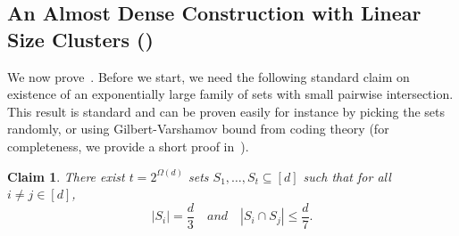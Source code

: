 \documentclass[11pt]{article}
\newtheorem{claim}[lemma]{Claim}
\theoremstyle{definition}
\renewcommand{\leq}{\leqslant}
\newcommand{\card}[1]{\left\vert{#1}\right\vert}
\DeclareMathOperator*{\Exp}{\ensuremath{{\mathbb{E}}}}
\DeclareMathOperator*{\Prob}{\ensuremath{\textnormal{Pr}}}
\renewcommand{\Pr}{\Prob}
\begin{document}

\subsection{An Almost Dense Construction with  Linear Size Clusters ()}\label{sec:sparse-cluster-packing}

We now prove~. Before we start, we need the following standard claim on existence of an exponentially large 
family of sets with small pairwise intersection. This result is standard and can be proven easily for instance by picking the sets randomly, or using Gilbert-Varshamov bound from coding theory (for completeness, we provide
a short proof in~). 

\begin{claim}\label{claim:num-of-sets}
        There exist $t=2^{\Omega(d)}$ sets $S_1, \ldots, S_t\subseteq [d]$ such that for all $i \neq j \in [d]$, 
        \[
        		\card{S_i} = \frac{d}{3} \quad and \quad \card{S_i \cap S_j} \leq \frac{d}{7}.
	\]
\end{claim}
\end{document}

